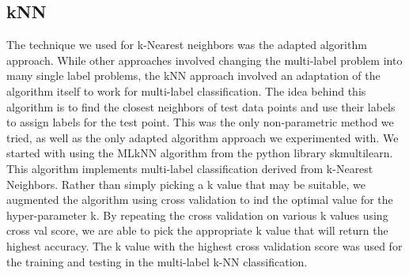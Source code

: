 \documentclass[sigconf]{acmart}
\begin{document}
\subsection{kNN}
The technique we used for k-Nearest neighbors was the adapted algorithm approach.  While other approaches involved changing the multi-label problem into many single label problems, the kNN approach involved an adaptation of the algorithm itself to work for multi-label classification. The idea behind this algorithm is to find the closest neighbors of test data points and use their labels to assign labels for the test point.  This was the only non-parametric method we tried, as well as the only adapted algorithm approach we experimented with. We started with using the MLkNN algorithm from the python library skmultilearn. This algorithm implements multi-label classification derived from k-Nearest Neighbors. Rather than simply picking a k value that may be suitable, we augmented the algorithm using cross validation to ind the optimal value for the hyper-parameter k. By repeating the cross validation on various k values using cross val score, we are able to pick the appropriate k value that will return the highest accuracy. The k value with the highest cross validation score was used for the training and testing in the multi-label k-NN classification.
\end{document}
